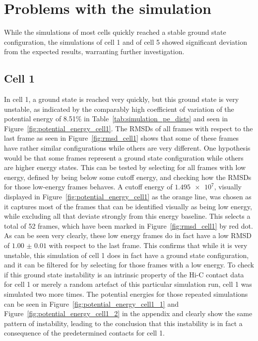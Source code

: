 
\section{Problems with the simulation} %
\label{sec:problems_with_the_simulation}

While the simulations of most cells quickly reached a stable ground state configuration, the simulations of cell 1 and of cell 5 showed significant deviation from the expected results, warranting further investigation.

\subsection{Cell 1} %
\label{sub:cell_1}

In cell 1, a ground state is reached very quickly, but this ground state is very unstable, as indicated by the comparably high coefficient of variation of the potential energy of 8.51\% in Table~\ref{tab:simulation_pe_dists} and seen in Figure~\ref{fig:potential_energy_cell1}. The RMSDs of all frames with respect to the last frame as seen in Figure~\ref{fig:rmsd_cell1} shows that some of these frames have rather similar configurations while others are very different. One hypothesis would be that some frames represent a ground state configuration while others are higher energy states. This can be tested by selecting for all frames with low energy, defined by being below some cutoff energy, and checking how the RMSDs for those low-energy frames behaves. A cutoff energy of \(\num{1.495e7}\), visually displayed in Figure~\ref{fig:potential_energy_cell1} as the orange line, was chosen as it captures most of the frames that can be identified visually as being low energy, while excluding all that deviate strongly from this energy baseline. This selects a total of 52 frames, which have been marked in Figure~\ref{fig:rmsd_cell1} by red dot. As can be seen very clearly, these low energy frames do in fact have a low RMSD of \(\num{1.00(1)}\) with respect to the last frame. This confirms that while it is very unstable, this simulation of cell 1 does in fact have a ground state configuration, and it can be filtered for by selecting for those frames with a low energy. To check if this ground state instability is an intrinsic property of the Hi-C contact data for cell 1 or merely a random artefact of this particular simulation run, cell 1 was simulated two more times. The potential energies for those repeated simulations can be seen in Figure~\ref{fig:potential_energy_cell1_1} and Figure~\ref{fig:potential_energy_cell1_2} in the appendix and clearly show the same pattern of instability, leading to the conclusion that this instability is in fact a consequence of the predetermined contacts for cell 1.

